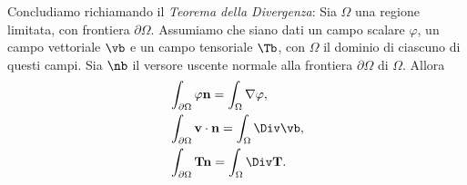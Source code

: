 Concludiamo richiamando il \textit{Teorema della Divergenza}:
Sia $\Omega$ una regione limitata, con frontiera $\partial\Omega$. Assumiamo che siano dati un campo scalare $\varphi$, un campo vettoriale $\vb$ e un campo tensoriale $\Tb$, con $\Omega$ il dominio di ciascuno di questi campi. Sia $\nb$ il versore  uscente normale alla frontiera $\partial\Omega$ di $\Omega$. Allora
\begin{equation}\label{theodiv}
	\begin{aligned}
		&\int_{\partial \Omega}\varphi\mathbf{n}=\int_\Omega\nabla\varphi, \\
		&\int_{\partial \Omega}\mathbf{v}\cdot\mathbf{n}  =\int_\Omega\Div \vb, \\
	&	\int_{\partial\Omega}\mathbf{Tn} =\int_\Omega\Div\mathbf{T}. 
	\end{aligned}
\end{equation}
%
%
%
%
%
